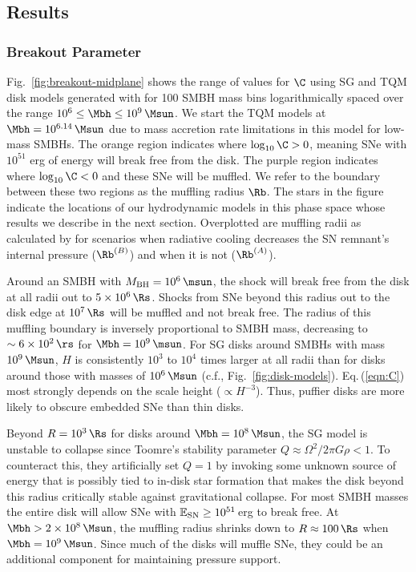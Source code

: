 
\subsection{Results} \label{sec:results-ch3}

\subsubsection{Breakout Parameter}
Fig.~\ref{fig:breakout-midplane} shows the range of values for $\C$ using SG and TQM disk models generated with  for 100 SMBH mass bins logarithmically spaced over the range $10^6 \leq \Mbh \leq 10^9\,\Msun$.
We start the TQM models at $\Mbh=10^{6.14}\,\Msun$ due to mass accretion rate limitations in this model for low-mass SMBHs.
The orange region indicates where $\log_{10}\C>0$, meaning SNe with $10^{51}$ erg of energy will break free from the disk.
The purple region indicates where $\log_{10}\C<0$ and these SNe will be muffled.
We refer to the boundary between these two regions as the muffling radius $\Rb$.
The stars in the figure indicate the locations of our hydrodynamic models in this phase space whose results we describe in the next section.
Overplotted are muffling radii as calculated by \citet{Moranchel+21} for scenarios when radiative cooling decreases the SN remnant's internal pressure ($\Rb^{(B)}$) and when it is not ($\Rb^{(A)}$).

Around an SMBH with $M_{\rm BH}=10^6\,\msun$, the shock will break free from the disk at all radii out to $5\times10^6\,\Rs$.
Shocks from SNe beyond this radius out to the disk edge at $10^7\,\Rs$ will be muffled and not break free.
The radius of this muffling boundary is inversely proportional to SMBH mass, decreasing to $\sim 6\times10^2\,\rs$ for $\Mbh=10^9\,\msun$.
For SG disks around SMBHs with mass $10^9\,\Msun$, $H$ is consistently $10^3$ to $10^4$ times larger at all radii than for disks around those with masses of $10^6\,\Msun$ (c.f., Fig.~\ref{fig:disk-models}).
Eq.\,(\ref{eqn:C}) most strongly depends on the scale height ($\propto H^{-3}$).
Thus, puffier disks are more likely to obscure embedded SNe than thin disks.

Beyond $R=10^3\,\Rs$ for disks around $\Mbh=10^8\,\Msun$, the SG model is unstable to collapse since Toomre's stability parameter $Q\approx\Omega^2/2\pi G\rho < 1$.
To counteract this, they artificially set $Q=1$ by invoking some unknown source of energy that is possibly tied to in-disk star formation that makes the disk beyond this radius critically stable against gravitational collapse.
For most SMBH masses the entire disk will allow SNe with $\mathbb{E}_{\rm SN}\geq10^{51}$\,erg to break free.
At $\Mbh> 2\times10^8\,\Msun$, the muffling radius shrinks down to $R\approx100\,\Rs$ when $\Mbh=10^9\,\Msun$.
Since much of the disks will muffle SNe, they could be an additional component for maintaining pressure support.

